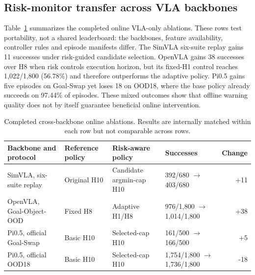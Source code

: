 \subsection{Risk-monitor transfer across VLA backbones}

Table~\ref{tab:cross-backbone} summarizes the completed online VLA-only
ablations. These rows test portability, not a shared leaderboard: the
backbones, feature availability, controller rules and episode manifests differ.
The SimVLA six-suite replay gains 11 successes under risk-guided candidate
selection. OpenVLA gains 38 successes over H8 when risk controls execution
horizon, but its fixed-H1 control reaches 1,022/1,800 (56.78\%) and therefore
outperforms the adaptive policy. Pi0.5 gains five episodes on Goal-Swap yet
loses 18 on OOD18, where the base policy already succeeds on 97.44\% of
episodes. These mixed outcomes show that offline warning quality does not by
itself guarantee beneficial online intervention.

\begin{table}[t]
  \caption{Completed cross-backbone online ablations. Results are internally
  matched within each row but not comparable across rows.}
  \label{tab:cross-backbone}
  \centering
  \small
  \begin{tabular}{llllr}
    \toprule
    Backbone and protocol & Reference policy & Risk-aware policy & Successes & Change \\
    \midrule
    SimVLA, six-suite replay & Original H10 & Candidate argmin-cap H10 & 392/680 \(\rightarrow\) 403/680 & +11 \\
    OpenVLA, Goal-Object-OOD & Fixed H8 & Adaptive H1/H8 & 976/1,800 \(\rightarrow\) 1,014/1,800 & +38 \\
    Pi0.5, official Goal-Swap & Basic H10 & Selected-cap H10 & 161/500 \(\rightarrow\) 166/500 & +5 \\
    Pi0.5, official OOD18 & Basic H10 & Selected-cap H10 & 1,754/1,800 \(\rightarrow\) 1,736/1,800 & -18 \\
    \bottomrule
  \end{tabular}
\end{table}

